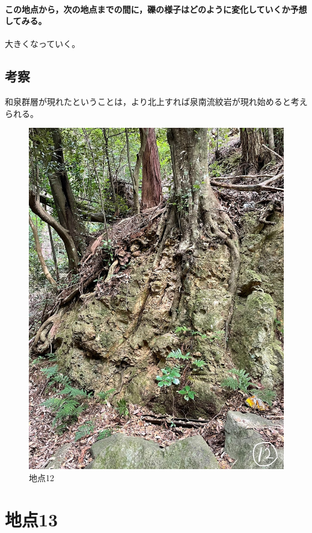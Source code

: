 \documentclass[uplatex,b5paper]{jsreport}
\begin{document}
      \paragraph{この地点から，次の地点までの間に，礫の様子はどのように変化していくか予想してみる。}
      大きくなっていく。
    \subsection{考察}
    和泉群層が現れたということは，より北上すれば泉南流紋岩が現れ始めると考えられる。
  \begin{figure}[h]
    \begin{center}
      \includegraphics[scale=0.15]{files/地学実習/地点12.jpg}
      \caption{地点12}
    \end{center}    
  \end{figure}
  \clearpage

  \section{地点13}
\end{document}
